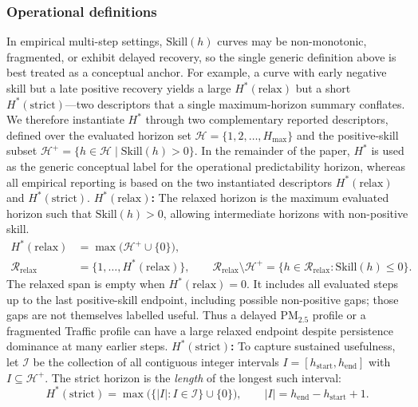 \documentclass[pdflatex,sn-mathphys]{sn-jnl}
\begin{document}
\subsubsection{Operational definitions}
In empirical multi-step settings, $\mathrm{Skill}(h)$ curves may be
non-monotonic, fragmented, or exhibit delayed recovery, so the single
generic definition above is best treated as a conceptual anchor.
For example, a curve with early negative skill but a late positive
recovery yields a large $H^*(\mathrm{relax})$ but a short
$H^*(\mathrm{strict})$—two descriptors that a single maximum-horizon
summary conflates.
We therefore instantiate $H^*$ through two complementary reported
descriptors, defined over the evaluated horizon set
$\mathcal{H} = \{1, 2, \dots, H_{\max}\}$ and the positive-skill
subset $\mathcal{H}^+ = \{h \in \mathcal{H} \mid \mathrm{Skill}(h) > 0\}$. In the remainder of the paper, $H^*$ is used as the generic conceptual label for the operational predictability horizon, whereas all empirical reporting is based on the two instantiated descriptors $H^*(\mathrm{relax})$ and $H^*(\mathrm{strict})$.
\textbf{$H^*(\mathrm{relax})$:} The relaxed horizon is the maximum
evaluated horizon such that $\mathrm{Skill}(h)>0$, allowing intermediate
horizons with non-positive skill.
\begin{equation}
  \begin{aligned}
  H^*(\mathrm{relax}) &= \max\!\bigl(\mathcal{H}^+ \cup \{0\}\bigr),\\
  \mathcal{R}_{\mathrm{relax}} &= \{1,\ldots,H^*(\mathrm{relax})\},\qquad
  \mathcal{R}_{\mathrm{relax}}\setminus\mathcal{H}^+
  =\{h\in\mathcal{R}_{\mathrm{relax}}:\mathrm{Skill}(h)\leq0\}.
  \end{aligned}
\end{equation}
The relaxed span is empty when $H^*(\mathrm{relax})=0$. It includes all
evaluated steps up to the last positive-skill endpoint, including possible
non-positive gaps; those gaps are not themselves labelled useful. Thus a
delayed PM$_{2.5}$ profile or a fragmented Traffic profile can have a large
relaxed endpoint despite persistence dominance at many earlier steps.
\textbf{$H^*(\mathrm{strict})$:} To capture sustained usefulness, let
$\mathcal{I}$ be the collection of all contiguous integer intervals
$I=[h_{\mathrm{start}},h_{\mathrm{end}}]$ with $I\subseteq\mathcal{H}^+$.
The strict horizon is the \emph{length} of the longest such interval:
\begin{equation}
  H^*(\mathrm{strict}) = \max\!\bigl(\{|I|:I\in\mathcal{I}\}\cup\{0\}\bigr),
  \qquad |I| = h_{\mathrm{end}} - h_{\mathrm{start}} + 1.
\end{equation}
\end{document}
